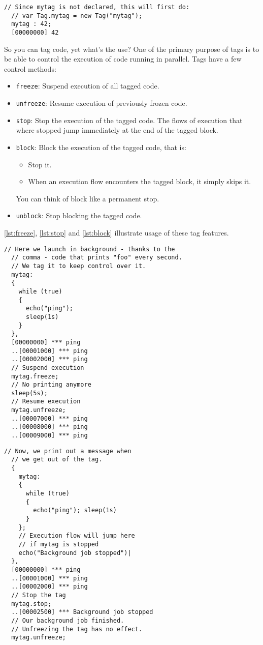 \documentclass[openright,twoside,12pt]{report}
\newcommand{\lst}[1]{\autoref{lst:#1}}
\begin{document}
\begin{lstlisting}[caption=Tag created implicitly,
  label=lst:implicit-tag]
  // Since mytag is not declared, this will first do:
  // var Tag.mytag = new Tag("mytag");
  mytag : 42;
  [00000000] 42
\end{lstlisting}

So you can tag code, yet what's the use? One of the primary purpose of
tags is to be able to control the execution of code running in
parallel. Tags have a few control methods:

\begin{itemize}
\item \texttt{freeze}: Suspend execution of all tagged code.
\item \texttt{unfreeze}: Resume execution of previously frozen code.
\item \texttt{stop}: Stop the execution of the tagged code. The flows
  of execution that where stopped jump immediately at the end of the
  tagged block.
\item \texttt{block}: Block the execution of the tagged code, that is:
  \begin{itemize}
  \item Stop it.
  \item When an execution flow encounters the tagged block, it simply
    skips it.
  \end{itemize}
  You can think of block like a permanent stop.
\item \texttt{unblock}: Stop blocking the tagged code.
\end{itemize}

\autoref{lst:freeze}, \lst{stop} and \lst{block} illustrate usage of these tag
features.

\begin{lstlisting}[caption=Freezing/unfreezing code execution, label=lst:freeze]
  // Here we launch in background - thanks to the
  // comma - code that prints "foo" every second.
  // We tag it to keep control over it.
  mytag:
  {
    while (true)
    {
      echo("ping");
      sleep(1s)
    }
  },
  [00000000] *** ping
  ..[00001000] *** ping
  ..[00002000] *** ping
  // Suspend execution
  mytag.freeze;
  // No printing anymore
  sleep(5s);
  // Resume execution
  mytag.unfreeze;
  ..[00007000] *** ping
  ..[00008000] *** ping
  ..[00009000] *** ping
\end{lstlisting}

\begin{lstlisting}[caption=Stopping code execution, label=lst:stop]
  // Now, we print out a message when
  // we get out of the tag.
  {
    mytag:
    {
      while (true)
      {
        echo("ping"); sleep(1s)
      }
    };
    // Execution flow will jump here
    // if mytag is stopped
    echo("Background job stopped")|
  },
  [00000000] *** ping
  ..[00001000] *** ping
  ..[00002000] *** ping
  // Stop the tag
  mytag.stop;
  ..[00002500] *** Background job stopped
  // Our background job finished.
  // Unfreezing the tag has no effect.
  mytag.unfreeze;
\end{lstlisting}
\end{document}

